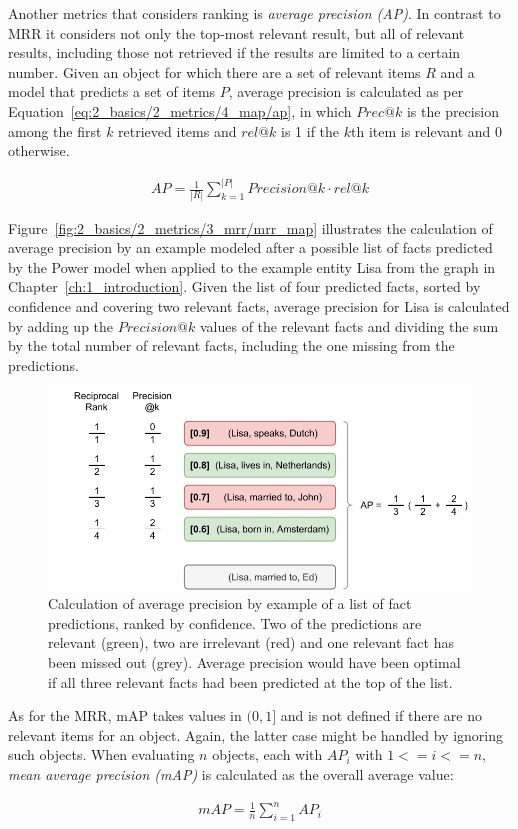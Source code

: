 Another metrics that considers ranking is \emph{average precision (AP)}. In contrast to MRR it considers not only the top-most relevant result, but all of relevant results, including those not retrieved if the results are limited to a certain number. Given an object for which there are a set of relevant items $R$ and a model that predicts a set of items $P$, average precision is calculated as per Equation~\ref{eq:2_basics/2_metrics/4_map/ap}, in which $Prec@k$ is the precision among the first $k$ retrieved items and $rel@k$ is 1 if the $k$th item is relevant and 0 otherwise.

\begin{align}
    AP = \frac{1}{|R|} \sum_{k=1}^{|P|} Precision@k \cdot rel@k
    \label{eq:2_basics/2_metrics/4_map/ap}
\end{align}

Figure~\ref{fig:2_basics/2_metrics/3_mrr/mrr_map} illustrates the calculation of average precision by an example modeled after a possible list of facts predicted by the Power model when applied to the example entity Lisa from the graph in Chapter~\ref{ch:1_introduction}. Given the list of four predicted facts, sorted by confidence and covering two relevant facts, average precision for Lisa is calculated by adding up the $Precision@k$ values of the relevant facts and dividing the sum by the total number of relevant facts, including the one missing from the predictions.

\begin{figure}[t]
    \centering
    \includegraphics{2_basics/2_metrics/4_map/mrr_map}
    \caption{Calculation of average precision by example of a list of fact predictions, ranked by confidence. Two of the predictions are relevant (green), two are irrelevant (red) and one relevant fact has been missed out (grey). Average precision would have been optimal if all three relevant facts had been predicted at the top of the list.}
    \label{fig:2_basics/2_metrics/4_map/mrr_map}
\end{figure}

As for the MRR, mAP takes values in $(0, 1]$ and is not defined if there are no relevant items for an object. Again, the latter case might be handled by ignoring such objects. When evaluating $n$ objects, each with $AP_i$ with $1 <= i <= n$, \emph{mean average precision (mAP)} is calculated as the overall average value:

\begin{align}
    mAP = \frac{1}{n} \sum_{i=1}^{n} AP_i
    \label{eq:2_basics/2_metrics/4_map/map}
\end{align}


